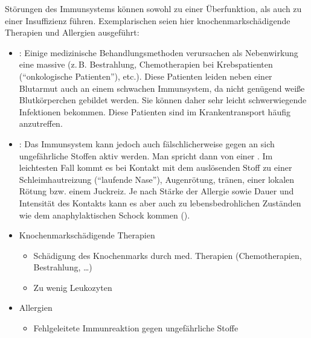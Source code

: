 {%
Störungen des Immunsystems können sowohl zu einer
Überfunktion, als auch zu einer Insuffizienz führen.
Exemplarischen seien hier knochenmarkschädigende Therapien
und Allergien ausgeführt: 

\begin{itemize}
  \item {}:
   Einige
  medizinische Behandlungsmethoden verursachen als
  Nebenwirkung eine massive  (z.\,B.
  Bestrahlung, Chemotherapien bei Krebspatienten
  (\enquote{onkologische Patienten}), etc.). Diese Patienten
  leiden neben einer Blutarmut auch an einem schwachen
  Immunsystem, da nicht genügend weiße Blutkörperchen
  gebildet werden. Sie können daher sehr leicht
  schwerwiegende Infektionen bekommen.
  Diese Patienten
  sind im Krankentransport häufig anzutreffen.
  \item {}:
  \label{topic:allergie}
  Das Immunsystem kann jedoch auch fälschlicherweise gegen
  an sich ungefährliche Stoffen aktiv werden.
  Man spricht dann von einer . Im leichtesten
  Fall kommt es bei Kontakt mit dem auslösenden Stoff zu
  einer Schleimhautreizung (\enquote{laufende Nase}),
  Augenrötung, tränen, einer lokalen Rötung bzw. einem
  Juckreiz. Je nach Stärke der Allergie sowie Dauer und
  Intensität des Kontakts kann es aber auch zu
  lebensbedrohlichen Zuständen wie dem anaphylaktischen
  Schock kommen
  ().
\end{itemize}

}{
\begin{itemize}
  \item Knochenmarkschädigende Therapien
  \begin{itemize}
    \item Schädigung des Knochenmarks durch med. Therapien (Chemotherapien,
    Bestrahlung, \ldots)
    \item Zu wenig Leukozyten
  \end{itemize}
  \item Allergien
  \begin{itemize}
    \item Fehlgeleitete Immunreaktion gegen ungefährliche Stoffe
  \end{itemize}
\end{itemize}
}{}{}{}






